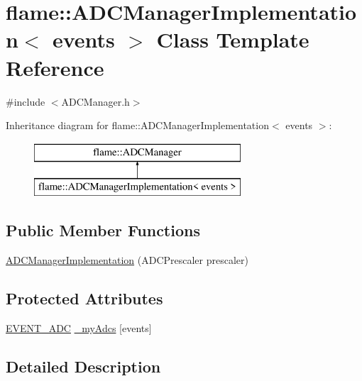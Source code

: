 \hypertarget{classflame_1_1_a_d_c_manager_implementation}{\section{flame\-:\-:A\-D\-C\-Manager\-Implementation$<$ events $>$ Class Template Reference}
\label{classflame_1_1_a_d_c_manager_implementation}
}


{\ttfamily \#include $<$A\-D\-C\-Manager.\-h$>$}

Inheritance diagram for flame\-:\-:A\-D\-C\-Manager\-Implementation$<$ events $>$\-:\begin{figure}[H]
\begin{center}
\leavevmode
\includegraphics[height=2.000000cm]{classflame_1_1_a_d_c_manager_implementation}
\end{center}
\end{figure}
\subsection*{Public Member Functions}
\begin{DoxyCompactItemize}
\item 
\hyperlink{classflame_1_1_a_d_c_manager_implementation_a0fff664ebb747ca532b8eebb980adae5}{A\-D\-C\-Manager\-Implementation} (A\-D\-C\-Prescaler prescaler)
\end{DoxyCompactItemize}
\subsection*{Protected Attributes}
\begin{DoxyCompactItemize}
\item 
\hyperlink{namespaceflame_a0fb9cd960c9db48d9e068daa2427aecf}{E\-V\-E\-N\-T\-\_\-\-A\-D\-C} \hyperlink{classflame_1_1_a_d_c_manager_implementation_aab124e6a32ba437c772a7c43492ed4af}{\-\_\-my\-Adcs} \mbox{[}events\mbox{]}
\end{DoxyCompactItemize}


\subsection{Detailed Description}
